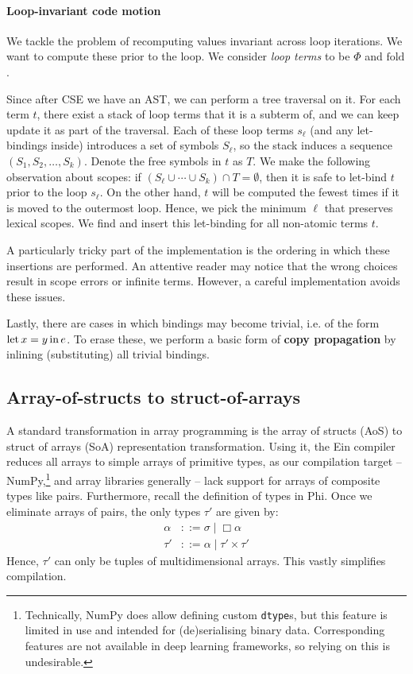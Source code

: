 \paragraph{Loop-invariant code motion} We tackle the problem of recomputing values invariant across loop iterations. We want to compute these prior to the loop. We consider \textit{loop terms} to be $\Phi$ and $\mathrm{fold}$. 

Since after CSE we have an AST, we can perform a tree traversal on it. For each term $t$, there exist a stack of loop terms that it is a subterm of, and we can keep update it as part of the traversal. Each of these loop terms $s_\ell$ (and any let-bindings inside) introduces a set of symbols $S_\ell$, so the stack induces a sequence $(S_1, S_2, \dots, S_k)$. Denote the free symbols in $t$ as $T$. We make the following observation about scopes: if $\left( S_\ell \cup \cdots \cup S_k \right) \cap T = \emptyset$, then it is safe to let-bind $t$ prior to the loop $s_\ell$. On the other hand, $t$ will be computed the fewest times if it is moved to the outermost loop. Hence, we pick the minimum $\ell$ that preserves lexical scopes. We find and insert this let-binding for all non-atomic terms $t$.

A particularly tricky part of the implementation is the ordering in which these insertions are performed. An attentive reader may notice that the wrong choices result in scope errors or infinite terms. However, a careful implementation avoids these issues. 

Lastly, there are cases in which bindings may become trivial, i.e. of the form $\mathrm{let}\,{x}={y}\,\mathrm{in}\,{e}$. To erase these, we perform a basic form of \textbf{copy propagation} by inlining (substituting) all trivial bindings.

\subsection{Array-of-structs to struct-of-arrays}

A standard transformation in array programming is the array of structs (AoS) to struct of arrays (SoA) representation transformation. Using it, the Ein compiler reduces all arrays to simple arrays of primitive types, as our compilation target -- NumPy,\footnote{Technically, NumPy does allow defining custom \texttt{dtype}s, but this feature is limited in use and intended for (de)serialising binary data. Corresponding features are not available in deep learning frameworks, so relying on this is undesirable.} and array libraries generally -- lack support for arrays of composite types like pairs. Furthermore, recall the definition of types in Phi. Once we eliminate arrays of pairs, the only types $\tau'$ are given by:
\begin{align*}
\alpha &::= \sigma \mid \Box \alpha \\
\tau' &::= \alpha \mid \tau' \times \tau'
\end{align*}
Hence, $\tau'$ can only be tuples of multidimensional arrays. This vastly simplifies compilation. 

